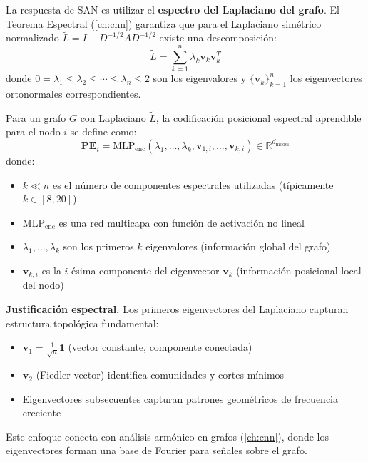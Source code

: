 La respuesta de SAN es utilizar el \textbf{espectro del Laplaciano del grafo}. El Teorema Espectral (\autoref{ch:cnn}) garantiza que para el Laplaciano simétrico normalizado $\tilde{L} = I - D^{-1/2}AD^{-1/2}$ existe una descomposición:
\begin{equation}
    \tilde{L} = \sum_{k=1}^{n} \lambda_k \mathbf{v}_k \mathbf{v}_k^T
    \label{eq:spectral_decomposition_san}
\end{equation}
donde $0 = \lambda_1 \leq \lambda_2 \leq \cdots \leq \lambda_n \leq 2$ son los eigenvalores y $\{\mathbf{v}_k\}_{k=1}^{n}$ los eigenvectores ortonormales correspondientes.

\begin{definition}\label{def:learned_spectral_pe}
Para un grafo $G$ con Laplaciano $\tilde{L}$, la codificación posicional espectral aprendible para el nodo $i$ se define como:
\begin{equation}
    \mathbf{PE}_i = \text{MLP}_{\text{enc}}(\lambda_1, \ldots, \lambda_k, \mathbf{v}_{1,i}, \ldots, \mathbf{v}_{k,i}) \in \mathbb{R}^{d_{\text{model}}}
    \label{eq:san_learned_positional_encoding}
\end{equation}
donde:
\begin{itemize}
    \item $k \ll n$ es el número de componentes espectrales utilizadas (típicamente $k \in [8, 20]$)
    \item $\text{MLP}_{\text{enc}}$ es una red multicapa con función de activación no lineal
    \item $\lambda_1, \ldots, \lambda_k$ son los primeros $k$ eigenvalores (información global del grafo)
    \item $\mathbf{v}_{k,i}$ es la $i$-ésima componente del eigenvector $\mathbf{v}_k$ (información posicional local del nodo)
\end{itemize}
\end{definition}

\textbf{Justificación espectral.}\label{rem:justification_spectral_pe} Los primeros eigenvectores del Laplaciano capturan estructura topológica fundamental:
\begin{itemize}
    \item $\mathbf{v}_1 = \frac{1}{\sqrt{n}}\mathbf{1}$ (vector constante, componente conectada)
    \item $\mathbf{v}_2$ (Fiedler vector) identifica comunidades y cortes mínimos
    \item Eigenvectores subsecuentes capturan patrones geométricos de frecuencia creciente
\end{itemize}
Este enfoque conecta con análisis armónico en grafos (\autoref{ch:cnn}), donde los eigenvectores forman una base de Fourier para señales sobre el grafo.

